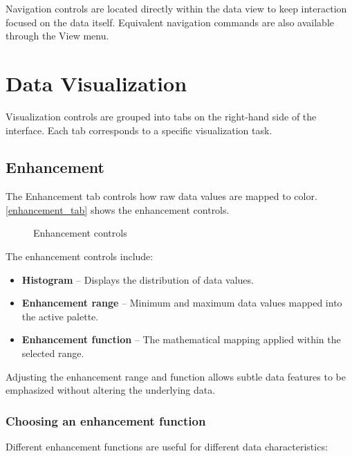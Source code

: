 Navigation controls are located directly within the data view to keep
interaction focused on the data itself. Equivalent navigation commands
are also available through the {\gui View} menu.

\section{Data Visualization}

Visualization controls are grouped into tabs on the right-hand side of the
interface.  Each tab corresponds to a specific visualization task.

\subsection{Enhancement}

The Enhancement tab controls how raw data values are mapped to color.
\autoref{enhancement_tab} shows the enhancement controls.

\begin{figure}
  \begin{center}
    \caption{Enhancement controls}
    \label{enhancement_tab}
  \end{center}
\end{figure}

The enhancement controls include:
\begin{itemize}
  \item \textbf{Histogram} -- Displays the distribution of data values.
  \item \textbf{Enhancement range} -- Minimum and maximum data values mapped
        into the active palette.
  \item \textbf{Enhancement function} -- The mathematical mapping applied
        within the selected range.
\end{itemize}

Adjusting the enhancement range and function allows subtle data features
to be emphasized without altering the underlying data.

\subsubsection*{Choosing an enhancement function}

Different enhancement functions are useful for different data
characteristics:

